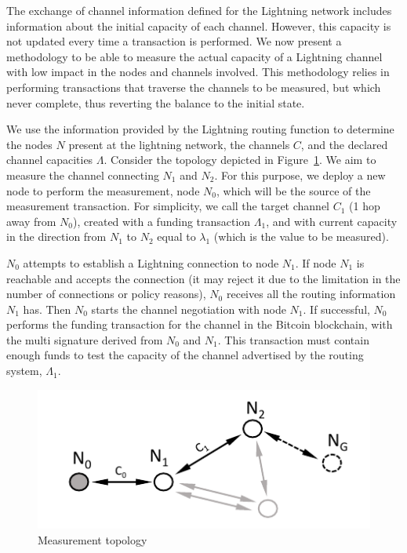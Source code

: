 \label{sec:methodology}
The exchange of channel information defined for the Lightning network includes information about the initial capacity of each channel. However, this capacity is not updated every time a transaction is performed.
We now present a methodology to be able to measure the actual capacity of a Lightning channel with low impact in the nodes and channels involved.
This methodology relies in performing transactions that traverse the channels to be measured, but which never complete, thus reverting the balance to the initial state. 

We use the information provided by the Lightning routing function to determine the nodes $N$ present at the lightning network, the channels $C$, and the declared channel capacities $\Lambda$.
Consider the topology depicted in Figure~\ref{fig:measurement-topology}.
We aim to measure the channel connecting $N_1$ and $N_2$. 
For this purpose, we deploy a new node to perform the measurement, node $N_0$, which will be the source of the measurement transaction.
For simplicity, we call the target channel $C_1$ (1 hop away from $N_0$), created with a funding transaction $\Lambda_1$, 
and with current capacity in the direction from $N_1$ to $N_2$ equal to $\lambda_1$ (which is the value to be measured).

$N_0$ attempts to establish a Lightning connection to node $N_1$. 
If node $N_1$ is reachable and accepts the connection (it may reject it due to the limitation in the number of connections or policy reasons), $N_0$ receives all the routing information $N_1$ has. 
Then $N_0$ starts the channel negotiation with node $N_1$. If successful, $N_0$ performs the funding transaction for the channel in the Bitcoin blockchain, with the multi signature derived from $N_0$ and $N_1$. 
This transaction must contain enough funds to test the capacity of the channel advertised by the routing system, $\Lambda_{1}$.



\begin{figure}[h!]
      \centering
      \includegraphics[width=0.99\linewidth]{img/measurement-topology.pdf}
      \caption{Measurement topology}
      \label{fig:measurement-topology}
\end{figure}

